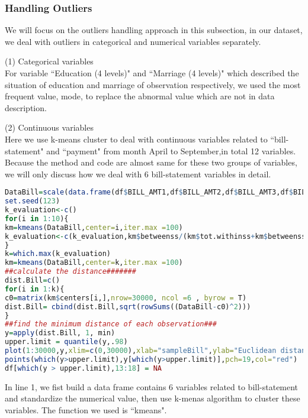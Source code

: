 \documentclass[a4paper,11pt]{article}
\begin{document}
\subsubsection{Handling Outliers}
We will focus on the outliers handling approach in this subsection, in our dataset, we deal with outliers in categorical and numerical variables separately.

(1) Categorical variables\\
For variable ``Education (4 levels)" and ``Marriage (4 levels)" which described the situation of education and marriage of observation respectively, we used the most frequent value, mode, to replace the abnormal value which are not in data description.

(2) Continuous variables\\
Here we use k-means cluster to deal with continuous variables related to ``bill-statement" and ``payment" from month April to September,in total 12 variables. Because the method and code are almost same for these two groups of variables, we will only discuss how we deal with 6 bill-statement variables in detail.

\begin{lstlisting}[language=R]
DataBill=scale(data.frame(df$BILL_AMT1,df$BILL_AMT2,df$BILL_AMT3,df$BILL_AMT4,df$BILL_AMT5,df$BILL_AMT6))
set.seed(123)
k_evaluation<-c()
for(i in 1:10){
km=kmeans(DataBill,center=i,iter.max =100)
k_evaluation<-c(k_evaluation,km$betweenss/(km$tot.withinss+km$betweenss))
}
k=which.max(k_evaluation)
km=kmeans(DataBill,center=k,iter.max =100)
##calculate the distance#######
dist.Bill=c()
for(i in 1:k){
c0=matrix(km$centers[i,],nrow=30000, ncol =6 , byrow = T)  
dist.Bill= cbind(dist.Bill,sqrt(rowSums((DataBill-c0)^2)))
}
##find the minimum distance of each observation###
y=apply(dist.Bill, 1, min)  
upper.limit = quantile(y,.98)
plot(1:30000,y,xlim=c(0,30000),xlab="sampleBill",ylab="Euclidean distance")  
points(which(y>upper.limit),y[which(y>upper.limit)],pch=19,col="red")
df[which(y > upper.limit),13:18] = NA
\end{lstlisting}
In line 1, we fist build a data frame contains 6 variables related to bill-statement and standardize the numerical value, then use k-menas algorithm to cluster these variables. The function we used is ``kmeans". 
\end{document}
